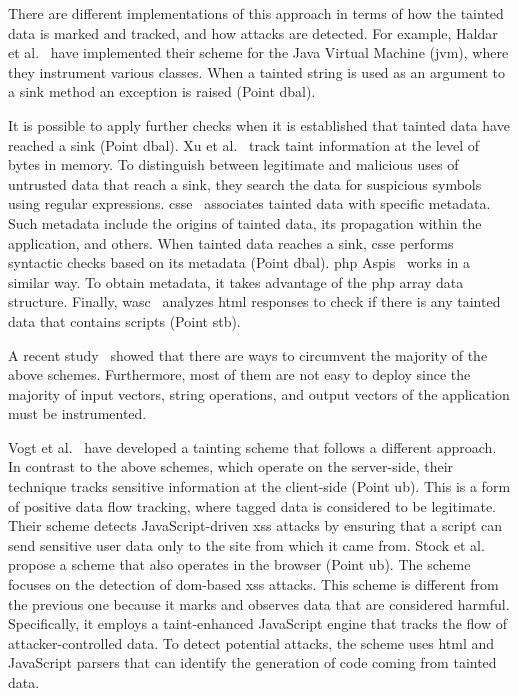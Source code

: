 \documentclass[10pt,journal,compsoc]{IEEEtran}
\begin{document}
There are different implementations of this approach
in terms of how the tainted data is marked and tracked,
and how attacks are detected.
For example, Haldar et al.~\cite{HCF05} have implemented
their scheme for the Java Virtual Machine ({\sc jvm}),
where they instrument various classes. When a
tainted string is used as an argument to a sink method
an exception is raised (Point {\sc dbal}).

It is possible to apply further checks when it is established that
tainted data have reached a sink (Point {\sc dbal}).
Xu et al.~\cite{XBS06} track taint information at the level of bytes in
memory. To distinguish between legitimate and malicious uses of
untrusted data that reach a sink, they search the data for suspicious
symbols using regular expressions. {\sc csse}~\cite{PB05}
associates tainted data with specific metadata. Such metadata include
the origins of tainted data, its propagation within the application,
and others. When tainted data reaches a sink, {\sc csse} performs
syntactic checks based on its metadata (Point {\sc dbal}).
{\sc php} Aspis~\cite{PMP11} works in a similar way. To obtain
metadata, it takes advantage of the  {\sc php} array data structure.
Finally, {\sc wasc}~\cite{NLC07} analyzes {\sc html} responses to check
if there is any tainted data that contains scripts (Point {\sc s}t{\sc b}).

A recent study~\cite{NBR14} showed that there are ways to circumvent
the majority of the above schemes. Furthermore, most of them are not
easy to deploy since the majority of input vectors, string operations,
and output vectors of the application must be instrumented.

Vogt et al.~\cite{VFJKKV07} have developed a tainting scheme
that follows a different approach. In contrast to the above
schemes, which operate on the server-side, their technique tracks sensitive
information at the client-side (Point {\sc ub}). This is a form of
positive data flow tracking, where tagged data is considered to be
legitimate. Their scheme detects JavaScript-driven {\sc xss} attacks
by ensuring that a script can send sensitive user data only to the
site from which it came from.
Stock et al.~\cite{SLMS14} propose a scheme that also operates
in the browser (Point {\sc ub}). The scheme focuses on the detection of
{\sc dom}-based {\sc xss} attacks.
This scheme is different from the previous one
because it marks and observes data that are considered harmful.
Specifically, it employs a taint-enhanced JavaScript engine that
tracks the flow of attacker-controlled data. To detect potential
attacks, the scheme uses {\sc html} and JavaScript parsers that can
identify the generation of code coming from tainted data.
\end{document}
